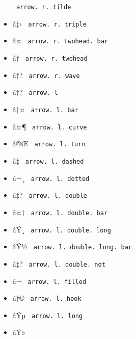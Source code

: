 \begin{itemize}
{  \texttt{\ arrow.\ r.\ tilde\ }}
\item
  \label{symbol-arrow.r.triple}{{ â‡› }
  \texttt{\ arrow.\ r.\ triple\ }}
\item
  \label{symbol-arrow.r.twohead.bar}{{ â¤ }
  \texttt{\ arrow.\ r.\ twohead.\ bar\ }}
\item
  \label{symbol-arrow.r.twohead}{{ â† }
  \texttt{\ arrow.\ r.\ twohead\ }}
\item
  \label{symbol-arrow.r.wave}{{ â†? }
  \texttt{\ arrow.\ r.\ wave\ }}
\item
  \label{symbol-arrow.l}{{ â†? } \texttt{\ arrow.\ l\ }}
\item
  \label{symbol-arrow.l.bar}{{ â†¤ }
  \texttt{\ arrow.\ l.\ bar\ }}
\item
  \label{symbol-arrow.l.curve}{{ â¤¶ }
  \texttt{\ arrow.\ l.\ curve\ }}
\item
  \label{symbol-arrow.l.turn}{{ â®Œ }
  \texttt{\ arrow.\ l.\ turn\ }}
\item
  \label{symbol-arrow.l.dashed}{{ â‡ }
  \texttt{\ arrow.\ l.\ dashed\ }}
\item
  \label{symbol-arrow.l.dotted}{{ â¬¸ }
  \texttt{\ arrow.\ l.\ dotted\ }}
\item
  \label{symbol-arrow.l.double}{{ â‡? }
  \texttt{\ arrow.\ l.\ double\ }}
\item
  \label{symbol-arrow.l.double.bar}{{ â¤† }
  \texttt{\ arrow.\ l.\ double.\ bar\ }}
\item
  \label{symbol-arrow.l.double.long}{{ âŸ¸ }
  \texttt{\ arrow.\ l.\ double.\ long\ }}
\item
  \label{symbol-arrow.l.double.long.bar}{{ âŸ½ }
  \texttt{\ arrow.\ l.\ double.\ long.\ bar\ }}
\item
  \label{symbol-arrow.l.double.not}{{ â‡? }
  \texttt{\ arrow.\ l.\ double.\ not\ }}
\item
  \label{symbol-arrow.l.filled}{{ â¬ }
  \texttt{\ arrow.\ l.\ filled\ }}
\item
  \label{symbol-arrow.l.hook}{{ â†© }
  \texttt{\ arrow.\ l.\ hook\ }}
\item
  \label{symbol-arrow.l.long}{{ âŸµ }
  \texttt{\ arrow.\ l.\ long\ }}
\item
  \label{symbol-arrow.l.long.bar}{{ âŸ» }
}
\end{itemize}
